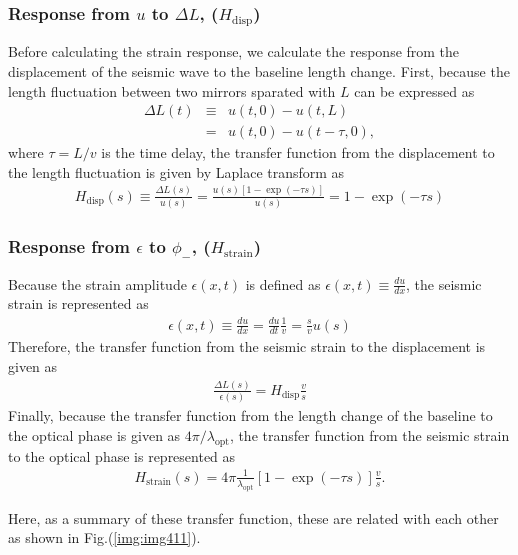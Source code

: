 \subsubsection{Response from $u$ to $\Delta{L}$, ($H_{\mathrm{disp}}$)}
Before calculating the strain response, we calculate the response from the displacement of the seismic wave to the baseline length change. First, because the length fluctuation between two mirrors sparated with $L$ can be expressed as 
\begin{eqnarray} 
  \Delta{L(t)} &\equiv& u(t,0) - u(t,L) \\
  &=& u(t,0) - u(t-\tau,0), \label{eq:eq403}
\end{eqnarray}
where $\tau=L/v$ is the time delay, the transfer function from the displacement to the length fluctuation is given by Laplace transform as
\begin{eqnarray} \label{eq:eq404}
  H_{\mathrm{disp}}(s) \equiv \frac{\Delta{L(s)}}{u(s)} = \frac{u(s)\left[ 1-\exp(-\tau{s}) \right]}{u(s)} = 1 - \exp(-\tau{s})
\end{eqnarray}

\subsubsection{Response from $\epsilon$ to $\phi_{-}$, ($H_{\mathrm{strain}}$)}
Because the strain amplitude $\epsilon{(x,t)}$ is defined as $\epsilon{(x,t)}\equiv\frac{du}{dx}$, the seismic strain is represented as 
\begin{eqnarray} 
  \epsilon{(x,t)} \equiv \frac{du}{dx} = \frac{du}{dt} \frac{1}{v} = \frac{s}{v}u(s) \label{eq:eq406}
\end{eqnarray}
Therefore, the transfer function from the seismic strain to the displacement is given  as
\begin{eqnarray} \label{eq:eq407}
  \frac{\Delta{L(s)}}{\epsilon(s)} = H_{\mathrm{disp}} \frac{v}{s}
\end{eqnarray}
Finally, because the transfer function from the length change of the baseline to the optical phase is given as $4\pi/{\lambda_{\mathrm{opt}}}$, the transfer function from the seismic strain to the optical phase is represented as 
\begin{eqnarray} \label{eq:eq407}
  H_{\mathrm{strain}}(s) = 4\pi\frac{1}{\lambda_{\mathrm{opt}}} \left[1 - \exp(-\tau{s}) \right]\frac{v}{s}.
\end{eqnarray}

Here, as a summary of these transfer function, these are related with each other as shown in Fig.(\ref{img:img411}). 

